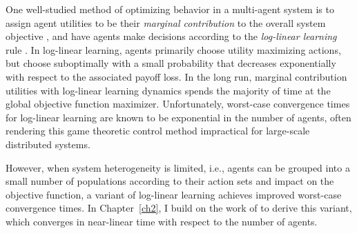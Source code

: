 One well-studied method of optimizing behavior in a multi-agent system is to assign agent utilities to be their {\it marginal contribution} to the overall system objective \cite{Wolpert1999}, and have agents make decisions according to the {\it log-linear learning} rule \cite{Blume1993}. In log-linear learning, agents primarily choose utility maximizing actions, but choose suboptimally with a small probability that decreases exponentially with respect to the associated payoff loss. In the long run, marginal contribution utilities with log-linear learning dynamics spends the majority of time at the global objective function maximizer. Unfortunately, worst-case convergence times for log-linear learning are known to be exponential in the number of agents, \cite{Shah2010} often rendering this game theoretic control method impractical for large-scale distributed systems. 

However, when system heterogeneity is limited, i.e., agents can be grouped into a small number of populations according to their action sets and impact on the objective function, a variant of log-linear learning achieves improved worst-case convergence times. In Chapter~\ref{ch2}, I build on the work of \cite{Shah2010} to derive this variant, which converges in near-linear time with respect to the number of agents. 














